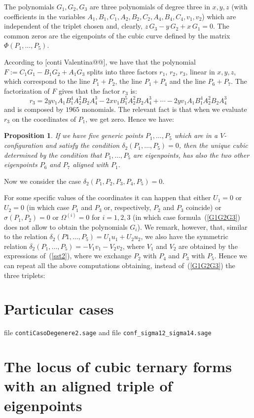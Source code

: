 \documentclass[12pt, a4paper, reqno, captions=tableheading,bibliography=totoc]{scrartcl}
\theoremstyle{plain}
\newtheorem{prop}[lemma]{Proposition}
\theoremstyle{definition}
\begin{document}
The polynomials $G_1, G_2, G_3$ are three polynomials of degree three
in $x, y, z$ (with coefficients in the variables
$A_1, B_1, C_1, A_2, B_2, C_2, A_4, B_4, C_4, v_1, v_2$) which are independent
of the triplet chosen and, clearly, $z\,G_3-y\,G_2+x\,G_1 = 0$. The common
zeros are the eigenpoints of the cubic curve defined by the matrix
$\Phi(P_1, \dots, P_5)$.

According to [conti Valentina@@], we have that the polynomial
$F := C_1G_1-B_1G_2+A_1G_3$ splits into three factors $r_1$, $r_2$, $r_3$,
linear in $x, y, z$, which
correspond to the line $P_1+P_2$, the line $P_1+P_4$ and the line $P_6+P_7$.
The factorization of $F$ gives that the factor $r_3$ is:
\[
r_3 = 2yv_1A_1B_1^4A_2^2B_2A_4^3-2xv_1B_1^5A_2^2B_2A_4^3+\cdots
-2 yv_1A_1B_1^4A_2^2B_2A_4^3
\]
and is composed by $1965$ monomials. The relevant fact is that when we
evaluate $r_3$ on the coordinates of $P_1$, we get zero. Hence we have:
\begin{prop}
If we have five generic points $P_1, \dots, P_5$ which are in a
$V$-configuration and satisfy the condition $\delta_2(P_1, \dots, P_5) = 0$,
then the unique cubic determined by the condition that $P_1, \dots, P_5$
are eigenpoints, has also the two other eigenpoints $P_6$ and $P_7$
aligned with $P_1$.
\end{prop}

Now we consider the case $\delta_2(P_1, P_2, P_3, P_4, P_5) = 0$.

For some specific values of the coordinates it can happen that either
$U_1=0$ or $U_2=0$ (in which case $P_1$ and $P_3$ or, respectively, $P_2$
and $P_3$ coincide) or $\sigma(P_1, P_2) = 0$ or $\Omega^{(i)} = 0$ for
$i = 1, 2, 3$ (in which case formula~(\ref{G1G2G3}) does not allow to
obtain the polynomials $G_i$). We remark, however, that, similar to the
relation $\delta_2(P1, \dots, P_5) = U_1u_1+U_2u_2$, we also have the
symmetric relation $\delta_2(P_1, \dots, P_5) = -V_1v_1-V_2v_2$, where
$V_1$ and $V_2$ are obtained by the expressions of~(\ref{sst2}), where
we exchange $P_2$ with $P_4$ and $P_3$ with $P_5$. Hence we can repeat
all the above computations obtaining, instead of~(\ref{G1G2G3}) the
three triplets:

\section{Particular cases}
file \verb+contiCasoDegenere2.sage+ and file
\verb+conf_sigma12_sigma14.sage+

\section{The locus of cubic ternary forms with an aligned triple of eigenpoints}
\end{document}
